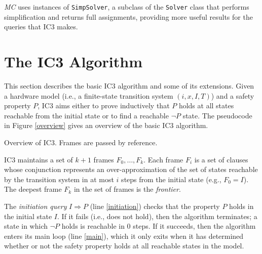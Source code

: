 \documentclass[12pt,a4paper,twoside,openright]{report}
\begin{document}
{{\emph{MC} uses instances of \verb,SimpSolver,, a subclass of the \verb,Solver, class
that performs simplification and returns full assignments, providing more useful results
for the queries that IC3 makes.

\section{The IC3 Algorithm}
\label{prep:ic3}
This section describes the basic IC3 algorithm and some of its extensions.
Given a hardware model (i.e., a finite-state transition system $(i,x,I,T)$) and a
safety property $P$, IC3 aims either to prove inductively that $P$ holds
at all states reachable from the initial state or
to find a reachable $\neg P$ state.
The pseudocode in Figure \ref{overview} gives an overview of the basic IC3 algorithm.	

\begin{algorithm}[t]
\DontPrintSemicolon
{}
\caption{Overview of IC3. Frames are passed by reference.}
\label{overview}
\end{algorithm}

IC3 maintains a set of $k + 1$ frames $F_0,\ldots,F_k$.
Each frame $F_i$ is a set of clauses whose conjunction represents an
over-approximation of the set of states reachable by the transition
system in at most $i$ steps from the initial state (e.g., $F_0 = I$).
The deepest frame $F_k$ in the set of frames is the \emph{frontier}.

The \emph{initiation query} $I \Rightarrow P$ (line \ref{initiation}) checks that
the property $P$ holds in the initial state $I$.
If it fails (i.e., does not hold), then the algorithm terminates;
a state in which $\neg P$ holds is reachable in 0 steps.
If it succeeds, then the algorithm enters its main loop (line \ref{main}),
which it only exits when it has determined whether or not the
safety property holds at all reachable states in the model.

}}
\end{document}
